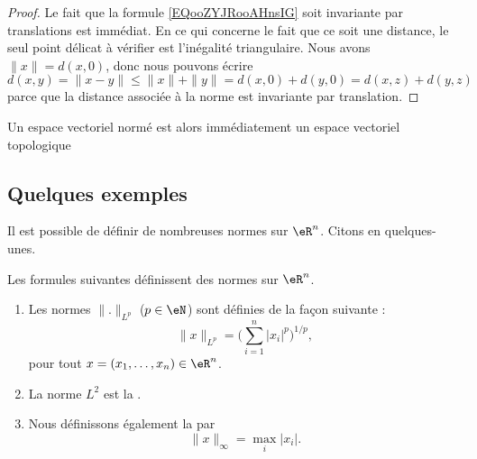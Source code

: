\begin{proof}
    Le fait que la formule \eqref{EQooZYJRooAHnsIG} soit invariante par translations est immédiat. En ce qui concerne le fait que ce soit une distance, le seul point délicat à vérifier est l'inégalité triangulaire. Nous avons \( \| x \|=d(x,0)\), donc nous pouvons écrire
    \begin{equation}
            d(x,y)=\| x-y \| \leq\| x \|+\| y \| =d(x,0)+d(y,0) =d(x,z)+d(y,z)
    \end{equation}
    parce que la distance associée à la norme est invariante par translation.
\end{proof}

Un espace vectoriel normé est alors immédiatement un espace vectoriel topologique

\subsection{Quelques exemples}

Il est possible de définir de nombreuses normes sur $\eR^n$. Citons en quelques-unes.

\begin{propositionDef}      \label{PROPooCLZRooIRxCnZ}
    Les formules suivantes définissent des normes sur \( \eR^n\).
    \begin{enumerate}
        \item
    Les normes $\| . \|_{L^p}$ ($p\in\eN$) sont définies de la façon suivante :
    \begin{equation}		\label{EqDeformeLp}
        \| x \|_{L^p}=\Big( \sum_{i=1}^n| x_i |^p\Big)^{1/p},
    \end{equation}
    pour tout $x=(x_1,\ldots,x_n)\in\eR^n$.
\item
    La norme $L^2$ est la .
\item
    Nous définissons également la  par
    \begin{equation}
	    \| x \|_{\infty}=\max_i| x_i |.
    \end{equation}
    \end{enumerate}
\end{propositionDef}

